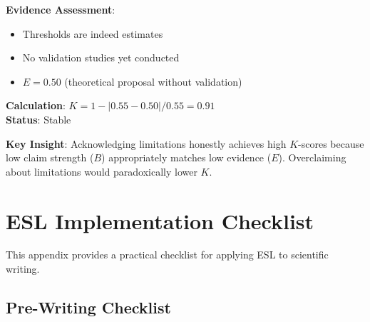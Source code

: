 \documentclass[11pt,a4paper]{article}
\begin{document}
\textbf{Evidence Assessment}:
\begin{itemize}
    \item Thresholds are indeed estimates
    \item No validation studies yet conducted
    \item $E = 0.50$ (theoretical proposal without validation)
\end{itemize}

\textbf{Calculation}: $K = 1 - |0.55 - 0.50| / 0.55 = 0.91$ \\
\textbf{Status}: \textcolor{green!60!black}{Stable}

\textbf{Key Insight}: Acknowledging limitations honestly achieves high $K$-scores because low claim strength ($B$) appropriately matches low evidence ($E$). Overclaiming about limitations would paradoxically lower $K$.


\section{ESL Implementation Checklist}
\label{app:checklist}

This appendix provides a practical checklist for applying ESL to scientific writing.

\subsection{Pre-Writing Checklist}
\end{document}
